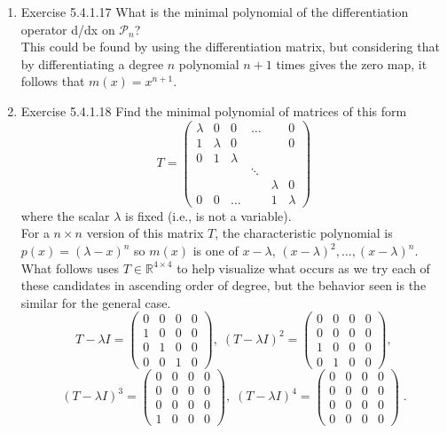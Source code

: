 \documentclass[a4paper]{article}
\begin{document}
\begin{enumerate}
\item{Exercise 5.4.1.17} What is the minimal polynomial of the differentiation operator d/dx on $\mathcal{P}_n$? \\

This could be found by using the differentiation matrix, but considering that by differentiating a degree $n$ polynomial $n+1$ times gives the zero map, it follows that $m(x) = x^{n+1}$. 

\item{Exercise 5.4.1.18} Find the minimal polynomial of matrices of this form
$$ T =
\begin{pmatrix}
\lambda & 0 & 0 & \dots & & 0 \\
1 & \lambda & 0 & & & 0 \\
0 & 1 & \lambda \\
& & & \ddots \\
& & & & \lambda & 0 \\
0 & 0 & \dots & & 1 & \lambda
\end{pmatrix}
$$
where the scalar $\lambda$ is fixed (i.e., is not a variable). \\

For a $n\times n$ version of this matrix $T$, the characteristic polynomial is $p(x) = (\lambda - x)^n$ so $m(x)$ is one of $x-\lambda$, $(x-\lambda)^2, \dots, (x-\lambda)^n$. What follows uses $T \in \mathbb{R}^{4\times 4}$ to help visualize what occurs as we try each of these candidates in ascending order of degree, but the behavior seen is the similar for the general case.
$$
T - \lambda I = 
\begin{pmatrix}
0&0&0&0\\ 1&0&0&0 \\ 0&1&0&0 \\ 0&0&1&0
\end{pmatrix}, \;
(T - \lambda I)^2 = 
\begin{pmatrix}
0&0&0&0\\ 0&0&0&0 \\ 1&0&0&0 \\ 0&1&0&0
\end{pmatrix},
$$
$$
(T - \lambda I)^3 = 
\begin{pmatrix}
0&0&0&0\\ 0&0&0&0 \\ 0&0&0&0 \\ 1&0&0&0
\end{pmatrix}, \;
(T - \lambda I)^4 =
\begin{pmatrix}
0&0&0&0\\ 0&0&0&0 \\ 0&0&0&0 \\ 0&0&0&0
\end{pmatrix} \;.
$$


\end{enumerate}
\end{document}
